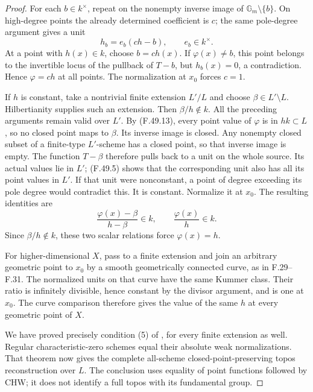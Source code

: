 \begin{proof}
For each \(b\in k^\times\), repeat on the nonempty inverse image
of \(\mathbb G_m\setminus\{b\}\). On high-degree points the
already determined coefficient is \(c\); the same pole-degree
argument gives a unit
\[
                              h_b=e_b(ch-b),
                       \qquad e_b\in k^\times.
\]
At a point with \(h(x)\in k\), choose \(b=ch(x)\).
If \(\varphi(x)\ne b\), this point belongs to the invertible
locus of the pullback of \(T-b\), but \(h_b(x)=0\), a contradiction.
Hence \(\varphi=ch\) at all points. The normalization at \(x_0\)
forces \(c=1\).

If \(h\) is constant, take a nontrivial finite extension \(L'/L\)
and choose \(\beta\in L'\setminus L\). Hilbertianity supplies
such an extension. Then \(\beta/h\notin k\).
All the preceding arguments remain valid over \(L'\).
By (F.49.13), every point value of \(\varphi\) is in \(hk\subset L\),
so no closed point maps to \(\beta\). Its inverse image is closed.
Any nonempty closed subset of a finite-type \(L'\)-scheme has a
closed point, so that inverse image is empty.
The function \(T-\beta\) therefore pulls back to a unit on the
whole source. Its actual values lie in \(L'\); (F.49.5) shows that
the corresponding unit also has all its point values in \(L'\).
If that unit were nonconstant, a point of degree exceeding its
pole degree would contradict this. It is constant.
Normalize it at \(x_0\). The resulting identities are
\[
          \frac{\varphi(x)-\beta}{h-\beta}\in k,\qquad
          \frac{\varphi(x)}{h}\in k.
 \tag{F.49.14}
\]
Since \(\beta/h\notin k\), these two scalar relations force
\(\varphi(x)=h\).

For higher-dimensional \(X\), pass to a finite extension and join
an arbitrary geometric point to \(x_0\) by a smooth geometrically
connected curve, as in F.29--F.31. The normalized units on that
curve have the same Kummer class. Their ratio is infinitely
divisible, hence constant by the divisor argument, and is one
at \(x_0\). The curve comparison therefore gives the value of
the same \(h\) at every geometric point of \(X\).

We have proved precisely condition (5) of
\citet[Theorem~4.18]{F_CHW2024}, for every finite extension as well.
Regular characteristic-zero schemes equal their absolute weak
normalizations. That theorem now gives the complete all-scheme
closed-point-preserving topos reconstruction over \(L\).
The conclusion uses equality of point functions followed by
CHW; it does not identify a full topos with its fundamental group.


\end{proof}
